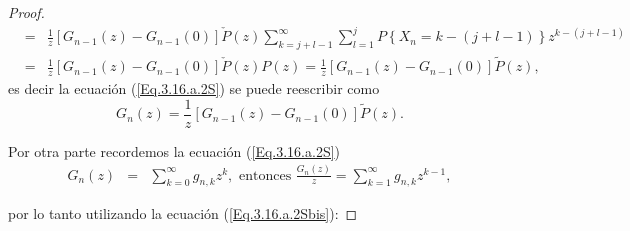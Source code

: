 \begin{proof}
\begin{eqnarray*}
&=&\frac{1}{z}\left[G_{n-1}\left(z\right)-G_{n-1}\left(0\right)\right]\check{P}\left(z\right)
\sum_{k=j+l-1}^{\infty}\sum_{l=1}^{j}
P\left\{X_{n}=k-\left(j+l-1\right)\right\}z^{k-\left(j+l-1\right)}\\
&=&\frac{1}{z}\left[G_{n-1}\left(z\right)-G_{n-1}\left(0\right)\right]\check{P}\left(z\right)P\left(z\right)=\frac{1}{z}\left[G_{n-1}\left(z\right)-G_{n-1}\left(0\right)\right]\tilde{P}\left(z\right),
\end{eqnarray*}
es decir la ecuaci\'on (\ref{Eq.3.16.a.2S}) se puede reescribir como
\begin{equation}\label{Eq.3.16.a.2Sbis}
G_{n}\left(z\right)=\frac{1}{z}\left[G_{n-1}\left(z\right)-G_{n-1}\left(0\right)\right]\tilde{P}\left(z\right).
\end{equation}

Por otra parte recordemos la ecuaci\'on (\ref{Eq.3.16.a.2S})
\begin{eqnarray*}
G_{n}\left(z\right)&=&\sum_{k=0}^{\infty}g_{n,k}z^{k},\textrm{ entonces }\frac{G_{n}\left(z\right)}{z}=\sum_{k=1}^{\infty}g_{n,k}z^{k-1},
\end{eqnarray*}

por lo tanto utilizando la ecuaci\'on (\ref{Eq.3.16.a.2Sbis}):


\end{proof}
